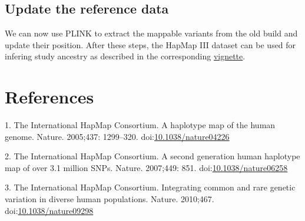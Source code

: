 \documentclass[]{article}
\newenvironment{Shaded}{}{}
\newcommand{\FunctionTok}[1]{\textcolor[rgb]{0.02,0.16,0.49}{#1}}
\newcommand{\VariableTok}[1]{\textcolor[rgb]{0.10,0.09,0.49}{#1}}
\newcommand{\ExtensionTok}[1]{#1}
\newcommand{\NormalTok}[1]{#1}
\begin{document}
\subsection{Update the reference data}\label{update-the-reference-data}

We can now use PLINK to extract the mappable variants from the old build
and update their position. After these steps, the HapMap III dataset can
be used for infering study ancestry as described in the corresponding
\href{https://hannahvmeyer.github.io/plinkQC/articles/AncestryCheck.html}{vignette}.

\begin{Shaded}
\end{Shaded}

\section*{References}\label{references}

\hypertarget{refs}{}
\hypertarget{ref-HapMap2005}{}
1. The International HapMap Consortium. A haplotype map of the human
genome. Nature. 2005;437: 1299--320.
doi:\href{https://doi.org/10.1038/nature04226}{10.1038/nature04226}

\hypertarget{ref-HapMap2007}{}
2. The International HapMap Consortium. A second generation human
haplotype map of over 3.1 million SNPs. Nature. 2007;449: 851.
doi:\href{https://doi.org/10.1038/nature06258}{10.1038/nature06258}

\hypertarget{ref-HapMap2010}{}
3. The International HapMap Consortium. Integrating common and rare
genetic variation in diverse human populations. Nature. 2010;467.
doi:\href{https://doi.org/10.1038/nature09298}{10.1038/nature09298}
\end{document}
